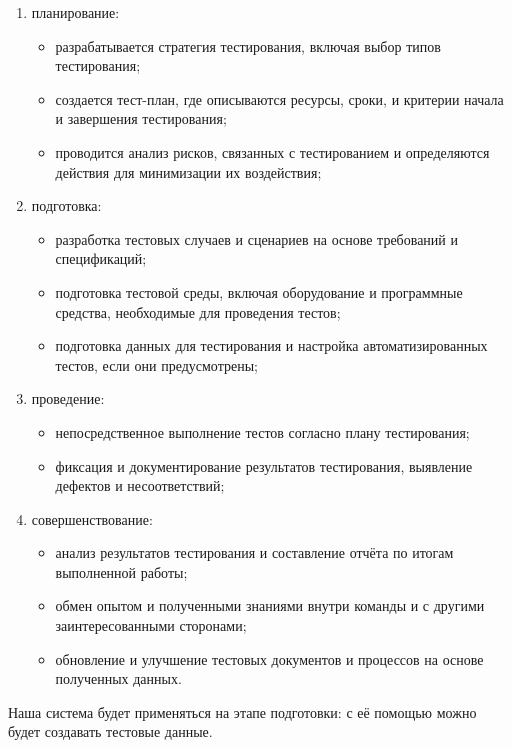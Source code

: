 \begin{enumerate}
    \item планирование:
    \begin{itemize}
        \item разрабатывается стратегия тестирования, включая выбор типов тестирования;
        \item создается тест-план, где описываются ресурсы, сроки, и критерии начала и завершения тестирования;
        \item проводится анализ рисков, связанных с тестированием и определяются действия для минимизации их воздействия;
    \end{itemize}

    \item подготовка:
    \begin{itemize}
        \item разработка тестовых случаев и сценариев на основе требований и спецификаций;
        \item подготовка тестовой среды, включая оборудование и программные средства, необходимые для проведения тестов;
        \item подготовка данных для тестирования и настройка автоматизированных тестов, если они предусмотрены;
    \end{itemize}

    \item проведение:
    \begin{itemize}
        \item непосредственное выполнение тестов согласно плану тестирования;
        \item фиксация и документирование результатов тестирования, выявление дефектов и несоответствий;
    \end{itemize}

    \item совершенствование:
    \begin{itemize}
        \item анализ результатов тестирования и составление отчёта по итогам выполненной работы;
        \item обмен опытом и полученными знаниями внутри команды и с другими заинтересованными сторонами;
        \item обновление и улучшение тестовых документов и процессов на основе полученных данных.
    \end{itemize}
\end{enumerate}

Наша система будет применяться на этапе подготовки: с её помощью можно будет создавать тестовые данные.


